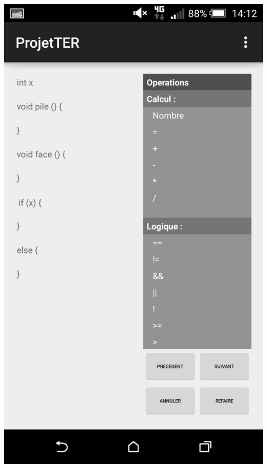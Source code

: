 \documentclass[a4paper]{article}
\begin{document}
\begin{center}
\includegraphics[scale=0.1]{img/create2.jpg}

\end{center}
\end{document}

